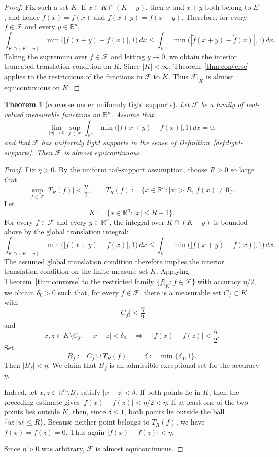 \documentclass[11pt]{article}
\theoremstyle{plain}
\newtheorem{theorem}{Theorem}
\theoremstyle{definition}
\theoremstyle{remark}
\newcommand{\R}{\mathbb{R}}
\newcommand{\F}{\mathcal{F}}
\newcommand{\meas}[1]{\lvert #1\rvert}
\begin{document}
\begin{proof}
Fix such a set $K$. If $x\in K\cap(K-y)$, then $x$ and $x+y$ both belong to
$E$, and hence $\widetilde f(x)=f(x)$ and $\widetilde f(x+y)=f(x+y)$.
Therefore, for every $f\in\F$ and every $y\in\R^n$,
\[
    \int_{K\cap(K-y)}
    \min\bigl(|f(x+y)-f(x)|,1\bigr)\,dx
    \le
    \int_{\R^n}
    \min\bigl(|\widetilde f(x+y)-\widetilde f(x)|,1\bigr)\,dx .
\]
Taking the supremum over $f\in\F$ and letting $y\to0$, we obtain the
interior truncated translation condition on $K$. Since $\meas{K}<\infty$,
Theorem~\ref{thm:converse} applies to the restrictions of the functions in
$\F$ to $K$. Thus $\F|_K$ is almost equicontinuous on $K$.
\end{proof}

\begin{theorem}[converse under uniformly tight supports]\label{thm:tail-converse}
Let $\F$ be a family of real-valued measurable functions on $\R^n$. Assume
that
\[
    \lim_{|y|\to0}\sup_{f\in\F}
    \int_{\R^n}\min\bigl(|f(x+y)-f(x)|,1\bigr)\,dx=0,
\]
and that $\F$ has uniformly tight supports in the sense of
Definition~\ref{def:tight-supports}.
Then $\F$ is almost equicontinuous.
\end{theorem}

\begin{proof}
Fix $\eta>0$. By the uniform tail-support assumption, choose $R>0$ so large
that
\[
    \sup_{f\in\F}\meas{T_R(f)}<\frac{\eta}{2},
    \qquad
    T_R(f):=\{x\in\R^n: |x|>R,\ f(x)\ne0\}.
\]
Let
\[
    K:=\{x\in\R^n: |x|\le R+1\}.
\]
For every $f\in\F$ and every $y\in\R^n$, the integral over $K\cap(K-y)$ is
bounded above by the global translation integral:
\[
    \int_{K\cap(K-y)}
    \min\bigl(|f(x+y)-f(x)|,1\bigr)\,dx
    \le
    \int_{\R^n}
    \min\bigl(|f(x+y)-f(x)|,1\bigr)\,dx .
\]
The assumed global translation condition therefore implies the interior
translation condition on the finite-measure set $K$. Applying
Theorem~\ref{thm:converse} to the restricted family $\{f|_K:f\in\F\}$ with
accuracy $\eta/2$, we obtain $\delta_0>0$ such that, for every $f\in\F$,
there is a measurable set $C_f\subset K$ with
\[
    \meas{C_f}<\frac{\eta}{2}
\]
and
\[
    x,z\in K\setminus C_f,\quad |x-z|<\delta_0
    \quad\Longrightarrow\quad
    |f(x)-f(z)|<\frac{\eta}{2}.
\]
Set
\[
    B_f:=C_f\cup T_R(f),
    \qquad
    \delta:=\min\{\delta_0,1\}.
\]
Then $\meas{B_f}<\eta$. We claim that $B_f$ is an admissible exceptional set
for the accuracy $\eta$.

Indeed, let $x,z\in\R^n\setminus B_f$ satisfy $|x-z|<\delta$. If both
points lie in $K$, then the preceding estimate gives
$|f(x)-f(z)|<\eta/2<\eta$. If at least one of the two points lies outside
$K$, then, since $\delta\le1$, both points lie outside the ball
$\{w:|w|\le R\}$. Because neither point belongs to $T_R(f)$, we have
$f(x)=f(z)=0$. Thus again $|f(x)-f(z)|<\eta$.

Since $\eta>0$ was arbitrary, $\F$ is almost equicontinuous.
\end{proof}
\end{document}
